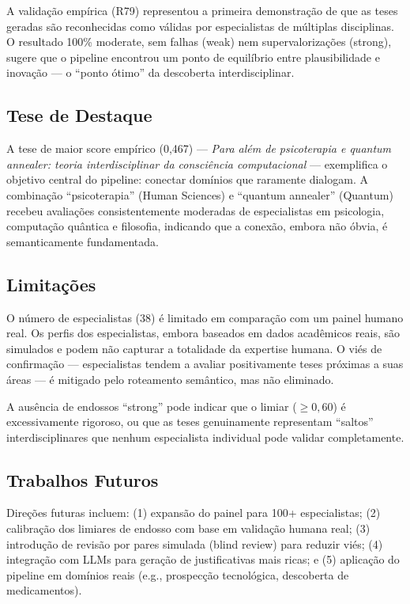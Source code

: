 \documentclass[a4paper,12pt]{article}
\begin{document}
A validação empírica (R79) representou a primeira demonstração de que as teses 
geradas são reconhecidas como válidas por especialistas de múltiplas disciplinas. 
O resultado 100\% moderate, sem falhas (weak) nem supervalorizações (strong), 
sugere que o pipeline encontrou um ponto de equilíbrio entre plausibilidade e 
inovação --- o ``ponto ótimo'' da descoberta interdisciplinar.

\subsection{Tese de Destaque}

A tese de maior score empírico (0,467) --- \emph{Para além de psicoterapia e 
quantum annealer: teoria interdisciplinar da consciência computacional} --- 
exemplifica o objetivo central do pipeline: conectar domínios que raramente 
dialogam. A combinação ``psicoterapia'' (Human Sciences) e ``quantum annealer'' 
(Quantum) recebeu avaliações consistentemente moderadas de especialistas em 
psicologia, computação quântica e filosofia, indicando que a conexão, embora 
não óbvia, é semanticamente fundamentada.

\subsection{Limitações}

O número de especialistas (38) é limitado em comparação com um painel humano real. 
Os perfis dos especialistas, embora baseados em dados acadêmicos reais, são 
simulados e podem não capturar a totalidade da expertise humana. O viés de 
confirmação --- especialistas tendem a avaliar positivamente teses próximas 
a suas áreas --- é mitigado pelo roteamento semântico, mas não eliminado.

A ausência de endossos ``strong'' pode indicar que o limiar ($\geq 0{,}60$) 
é excessivamente rigoroso, ou que as teses genuinamente representam ``saltos'' 
interdisciplinares que nenhum especialista individual pode validar completamente.

\subsection{Trabalhos Futuros}

Direções futuras incluem: (1) expansão do painel para 100+ especialistas; 
(2) calibração dos limiares de endosso com base em validação humana real; 
(3) introdução de revisão por pares simulada (blind review) para reduzir 
viés; (4) integração com LLMs para geração de justificativas mais ricas; 
e (5) aplicação do pipeline em domínios reais (e.g., prospecção tecnológica, 
descoberta de medicamentos).
\end{document}
